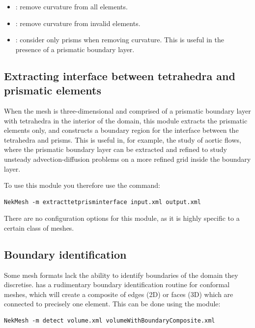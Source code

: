 \begin{itemize}
  \item {}: remove curvature from all elements.
  \item {}: remove curvature from invalid elements.
  \item {}: consider only prisms when removing curvature. This is
  useful in the presence of a prismatic boundary layer.
\end{itemize}

\subsection{Extracting interface between tetrahedra and prismatic elements}

When the mesh is three-dimensional and comprised of a prismatic boundary layer
with tetrahedra in the interior of the domain, this module extracts the
prismatic elements only, and constructs a boundary region for the interface
between the tetrahedra and prisms. This is useful in, for example, the study of
aortic flows, where the prismatic boundary layer can be extracted and refined to
study unsteady advection-diffusion problems on a more refined grid inside the
boundary layer.

To use this module you therefore use the command:

\begin{lstlisting}[style=BashInputStyle]
  NekMesh -m extracttetprisminterface input.xml output.xml
\end{lstlisting}

There are no configuration options for this module, as it is highly specific to
a certain class of meshes.

\subsection{Boundary identification}

Some mesh formats lack the ability to identify boundaries of the domain they
discretise. \nm has a rudimentary boundary identification routine for conformal
meshes, which will create a composite of edges (2D) or faces (3D) which are
connected to precisely one element. This can be done using the 
module:

\begin{lstlisting}[style=BashInputStyle]
  NekMesh -m detect volume.xml volumeWithBoundaryComposite.xml
\end{lstlisting}

